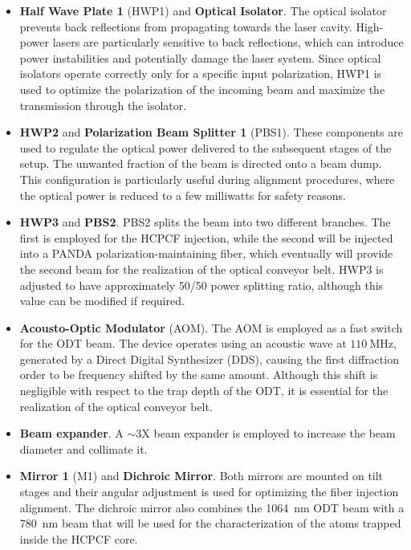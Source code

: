 \begin{itemize}
    \item \textbf{Half Wave Plate 1} (HWP1) and \textbf{Optical Isolator}. The optical isolator prevents back reflections from propagating towards the laser cavity. High-power lasers are particularly sensitive to back reflections, which can introduce power instabilities and potentially damage the laser system. Since optical isolators operate correctly only for a specific input polarization, HWP1 is used to optimize the polarization of the incoming beam and maximize the transmission through the isolator.
    
    \item \textbf{HWP2} and \textbf{Polarization Beam Splitter 1} (PBS1). These components are used to regulate the optical power delivered to the subsequent stages of the setup. The unwanted fraction of the beam is directed onto a beam dump. This configuration is particularly useful during alignment procedures, where the optical power is reduced to a few milliwatts for safety reasons.
    
    \item \textbf{HWP3} and \textbf{PBS2}. PBS2 splits the beam into two different branches. The first is employed for the HCPCF injection, while the second will be injected into a PANDA polarization-maintaining fiber, which eventually will provide the second beam for the realization of the optical conveyor belt. HWP3 is adjusted to have approximately 50/50 power splitting ratio, although this value can be modified if required.
    
    \item \textbf{Acousto-Optic Modulator} (AOM). The AOM is employed as a fast switch for the ODT beam. The device operates using an acoustic wave at \(110~\mathrm{MHz}\), generated by a Direct Digital Synthesizer (DDS), causing the first diffraction order to be frequency shifted by the same amount. Although this shift is negligible with respect to the trap depth of the ODT, it is essential for the realization of the optical conveyor belt.

    \item \textbf{Beam expander}. A $\sim$3X beam expander is employed to increase the beam diameter and collimate it.
    
    \item \textbf{Mirror 1} (M1) and \textbf{Dichroic Mirror}. Both mirrors are mounted on tilt stages and their angular adjustment is used for optimizing the fiber injection alignment. The dichroic mirror also combines the 1064~nm ODT beam with a 780~nm beam that will be used for the characterization of the atoms trapped inside the HCPCF core.
    

\end{itemize}
